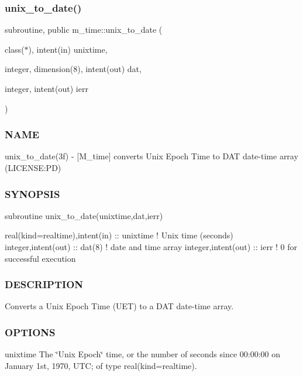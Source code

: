 \subsubsection{\texorpdfstring{unix\+\_\+to\+\_\+date()}{unix\_to\_date()}}
{\footnotesize\ttfamily subroutine, public m\+\_\+time\+::unix\+\_\+to\+\_\+date (\begin{DoxyParamCaption}\item[{class($\ast$), intent(in)}]{unixtime,  }\item[{integer, dimension(8), intent(out)}]{dat,  }\item[{integer, intent(out)}]{ierr }\end{DoxyParamCaption})}



\subsubsection*{N\+A\+ME}

unix\+\_\+to\+\_\+date(3f) -\/ \mbox{[}M\+\_\+time\mbox{]} converts Unix Epoch Time to D\+AT date-\/time array (L\+I\+C\+E\+N\+SE\+:PD) 

\subsubsection*{S\+Y\+N\+O\+P\+S\+IS}

\begin{DoxyVerb}subroutine unix_to_date(unixtime,dat,ierr)

 real(kind=realtime),intent(in) :: unixtime ! Unix time (seconds)
 integer,intent(out)            :: dat(8)   ! date and time array
 integer,intent(out)            :: ierr     ! 0 for successful execution
\end{DoxyVerb}


\subsubsection*{D\+E\+S\+C\+R\+I\+P\+T\+I\+ON}

Converts a Unix Epoch Time (U\+ET) to a D\+AT date-\/time array.

\subsubsection*{O\+P\+T\+I\+O\+NS}

unixtime The \char`\"{}\+Unix Epoch\char`\"{} time, or the number of seconds since 00\+:00\+:00 on January 1st, 1970, U\+TC; of type real(kind=realtime).

